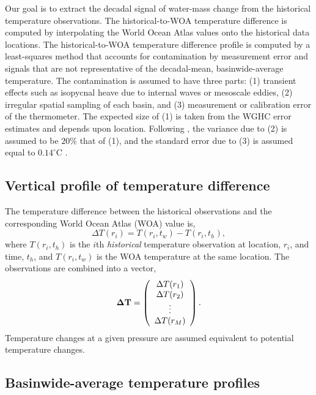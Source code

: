 \documentclass[12pt]{article}
\begin{document}
Our goal is to extract the decadal signal of water-mass change from
the historical temperature observations.  The historical-to-WOA
temperature difference is computed by interpolating the World Ocean
Atlas values onto the historical data locations. The historical-to-WOA
temperature difference profile is computed by a least-squares method
that accounts for contamination by measurement error and signals that
are not representative of the decadal-mean, basinwide-average
temperature. The contamination is assumed to have three parts: (1)
transient effects such as isopycnal heave due to internal waves or
mesoscale eddies, (2) irregular spatial sampling of each basin, and
(3) measurement or calibration error of the thermometer.  The expected
size of (1) is taken from the WGHC error estimates and depends upon
location.  Following \cite{Huang--2015:Heaving}, the variance due to
(2) is assumed to be $20\%$ that of (1), and the standard error due to
(3) is assumed equal to $0.14^{\circ}$C
\cite{Roemmich-Gould-2012:135}.


\subsection{Vertical profile of temperature difference}

The temperature difference between the historical observations and the
corresponding World Ocean Atlas (WOA) value is,
\begin{equation}
\Delta T(r_i) = T(r_i,t_w) - T(r_i,t_h),
\end{equation}
where $T(r_i,t_h)$ is the $i$th {\it historical} temperature
observation at location, $r_i$, and time, $t_h$, and $T(r_i,t_w)$ is
the WOA temperature at the same location. The observations are
combined into a vector,
\begin{equation}
{\boldsymbol \Delta}{\bf T} = \left(\begin{array}{c} \Delta T(r_1) \\
                                      \Delta T(r_2) \\ \vdots \\
                                      \Delta T(r_M) 
 \end{array} \right) .
\end{equation}
Temperature changes at a given pressure are assumed equivalent to potential temperature changes.

\subsection{Basinwide-average temperature profiles}
\end{document}
